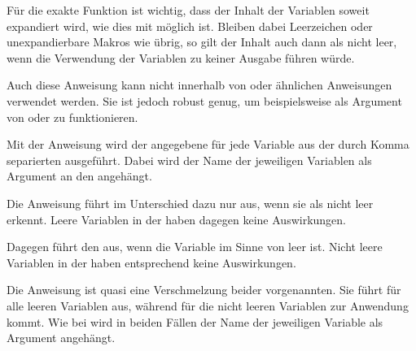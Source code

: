\begin{Declaration}
\end{Declaration}
Für die exakte Funktion ist wichtig, dass der Inhalt der Variablen soweit
expandiert wird, wie dies mit  möglich ist. Bleiben dabei
Leerzeichen oder unexpandierbare Makros wie  übrig, so gilt der
Inhalt auch dann als nicht leer, wenn die Verwendung der Variablen zu keiner
Ausgabe führen würde.

Auch diese Anweisung kann nicht innerhalb von
 oder ähnlichen Anweisungen verwendet werden. Sie ist
jedoch robust genug, um beispielsweise als Argument von
 oder  zu
funktionieren.%
\EndIndexGroup


\begin{Declaration}
\end{Declaration}
Mit der Anweisung
 wird der angegebene  für jede Variable
aus der durch Komma separierten  ausgeführt. Dabei wird
der Name der jeweiligen Variablen als Argument an den 
angehängt.

Die Anweisung  führt im Unterschied dazu
 nur aus, wenn  sie als
nicht leer erkennt. Leere Variablen in der  haben
dagegen keine Auswirkungen.

Dagegen führt  den  aus, wenn die
Variable im Sinne von  leer ist. Nicht
leere Variablen in der  haben entsprechend keine
Auswirkungen.

Die Anweisung  ist quasi eine Verschmelzung
beider vorgenannten. Sie führt  für alle leeren Variablen
aus, während  für die nicht leeren Variablen zur Anwendung
kommt. Wie bei  wird in beiden Fällen der Name der jeweiligen
Variable als Argument angehängt.%
\EndIndexGroup
%
\EndIndexGroup


